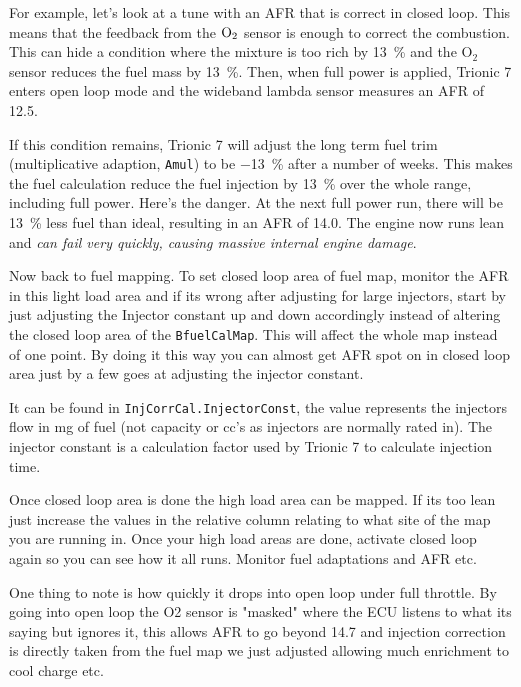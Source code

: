 \documentclass[11pt,a4paper]{book}
\begin{document}
For example, let's look at a tune with an AFR that is correct in closed loop.
This means that the feedback from the $\textrm O_2$ sensor is enough to
correct the combustion. This can hide a condition where the mixture is too rich
by \SI{13}{\percent} and the $\mathrm O_2$ sensor reduces the fuel mass by
\SI{13}{\percent}. Then, when full power is applied, Trionic 7 enters open loop
mode and the wideband lambda sensor measures an AFR of \num{12.5}.

If this condition remains, Trionic 7 will adjust the long term fuel trim
(multiplicative adaption, \texttt{Amul}) to be \SI{-13}{\percent}
after a number of weeks. This makes the fuel calculation reduce the fuel
injection by \SI{13}{\percent} over the whole range, including full power.
Here's the danger. At the next full power run, there will be \SI{13}{\percent}
less fuel than ideal, resulting in an AFR of \num{14.0}. The engine now runs
lean and \emph{can fail very quickly, causing massive internal engine damage}.

Now back to fuel mapping. To set closed loop area of fuel map, monitor the AFR
in this light load area and if its wrong after adjusting for large injectors,
start by just adjusting the Injector constant up and down accordingly instead of
altering the closed loop area of the \texttt{BfuelCalMap}. This will affect the
whole map instead of one point. By doing it this way you can almost get AFR spot
on in closed loop area just by a few goes at adjusting the injector constant.

It can be found in \texttt{InjCorrCal.InjectorConst}, the value represents the
injectors flow in mg of fuel (not capacity or cc's as injectors are normally
rated in). The injector constant is a calculation factor used by Trionic 7 to
calculate injection time.

Once closed loop area is done the high load area can be mapped. If its too lean
just increase the values in the relative column relating to what site of the map
you are running in. Once your high load areas are done, activate closed loop
again so you can see how it all runs. Monitor fuel adaptations and AFR etc.

One thing to note is how quickly it drops into open loop under full throttle. By
going into open loop the O2 sensor is "masked" where the ECU listens to what its
saying but ignores it, this allows AFR to go beyond 14.7 and injection
correction is directly taken from the fuel map we just adjusted allowing much
enrichment to cool charge etc.
\end{document}
